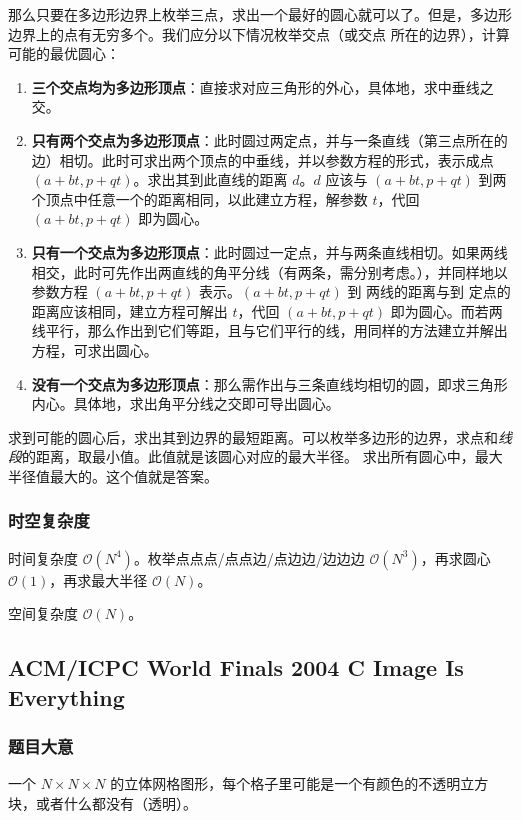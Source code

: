 				那么只要在多边形边界上枚举三点，求出一个最好的圆心就可以了。但是，多边形边界上的点有无穷多个。我们应分以下情况枚举交点（或交点
				所在的边界），计算可能的最优圆心：
				\begin{enumerate}
					\item {\bf 三个交点均为多边形顶点}：直接求对应三角形的外心，具体地，求中垂线之交。
					\item{\bf  只有两个交点为多边形顶点}：此时圆过两定点，并与一条直线（第三点所在的边）相切。此时可求出两个顶点的中垂线，并以参数方程的形式，表示成点 $(a+b t, p + qt)$。求出其到此直线的距离 $d$。$d$ 应该与 $(a+b t, p + qt)$ 到两个顶点中任意一个的距离相同，以此建立方程，解参数 $t$，代回  $(a+b t, p + qt)$ 即为圆心。
					\item {\bf 只有一个交点为多边形顶点}：此时圆过一定点，并与两条直线相切。如果两线相交，此时可先作出两直线的角平分线（有两条，需分别考虑。），并同样地以参数方程 $(a+b t, p + qt)$ 表示。$(a+b t, p + qt)$  到 两线的距离与到 定点的距离应该相同，建立方程可解出  $t$，代回  $(a+b t, p + qt)$ 即为圆心。而若两线平行，那么作出到它们等距，且与它们平行的线，用同样的方法建立并解出方程，可求出圆心。
					\item {\bf 没有一个交点为多边形顶点}：那么需作出与三条直线均相切的圆，即求三角形内心。具体地，求出角平分线之交即可导出圆心。
				\end{enumerate}
				
				求到可能的圆心后，求出其到边界的最短距离。可以枚举多边形的边界，求点和\emph{线段}的距离，取最小值。此值就是该圆心对应的最大半径。
				求出所有圆心中，最大半径值最大的。这个值就是答案。
			\subsubsection{时空复杂度}
				时间复杂度 $\mathcal{O}\left(N^4\right)$。枚举点点点/点点边/点边边/边边边 $\mathcal{O}\left(N^3\right)$，再求圆心 $\mathcal{O}\left(1\right)$，再求最大半径 $\mathcal{O}\left(N\right)$。
					
				空间复杂度 $\mathcal{O}\left(N\right)$。\newpage
		\subsection{ACM/ICPC World Finals 2004 C Image Is Everything}
			\subsubsection{题目大意}
				一个 $N \times N \times N$ 的立体网格图形，每个格子里可能是一个有颜色的不透明立方块，或者什么都没有（透明）。
				
